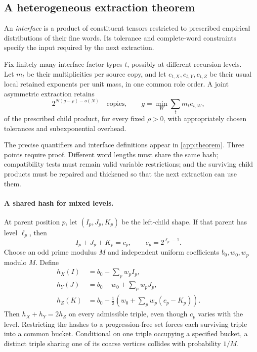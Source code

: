 \documentclass[11pt,a4paper]{article}
\begin{document}
\subsection{A heterogeneous extraction theorem}

An \emph{interface} is a product of constituent tensors restricted to prescribed empirical distributions of their fine words. Its tolerance and complete-word constraints specify the input required by the next extraction.

\begin{theorem}\label{thm:hetero-informal}
Fix finitely many interface-factor types $t$, possibly at different recursion levels. Let $m_t$ be their multiplicities per source copy, and let $e_{t,X},e_{t,Y},e_{t,Z}$ be their usual local retained exponents per unit mass, in one common role order. A joint asymmetric extraction retains
\[
2^{N(g-\rho)-o(N)}\quad\text{copies},\qquad
 g=\min_W\sum_t m_t e_{t,W},
\]
of the prescribed child product, for every fixed $\rho>0$, with appropriately chosen tolerances and subexponential overhead.
\end{theorem}

The precise quantifiers and interface definitions appear in \cref{app:theorem}. Three points require proof. Different word lengths must share the same hash; compatibility tests must remain valid variable restrictions; and the surviving child products must be repaired and thickened so that the next extraction can use them.

\paragraph{A shared hash for mixed levels.}
At parent position $p$, let $(I_p,J_p,K_p)$ be the left-child shape. If that parent has level $\ell_p$, then
\[
I_p+J_p+K_p=c_p,\qquad c_p=2^{\ell_p-1}.
\]
Choose an odd prime modulus $M$ and independent uniform coefficients $b_0,w_0,w_p$ modulo $M$. Define
\begin{equation}\label{eq:hash}
\begin{aligned}
h_X(I)&=b_0+\sum_p w_p I_p,\\
h_Y(J)&=b_0+w_0+\sum_p w_p J_p,\\
h_Z(K)&=b_0+\tfrac12\left(w_0+\sum_p w_p(c_p-K_p)\right).
\end{aligned}
\end{equation}
Then $h_X+h_Y=2h_Z$ on every admissible triple, even though $c_p$ varies with the level. Restricting the hashes to a progression-free set forces each surviving triple into a common bucket. Conditional on one triple occupying a specified bucket, a distinct triple sharing one of its coarse vertices collides with probability $1/M$.
\end{document}
